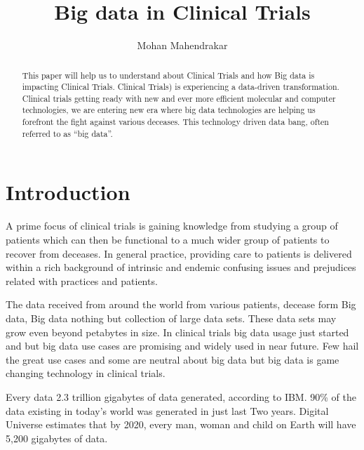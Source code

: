 \documentclass[sigconf]{acmart}
\begin{document}
\title{Big data in Clinical Trials}
\author{Mohan Mahendrakar}

\renewcommand{\shortauthors}{B. Trovato et al.}


\begin{abstract}
This paper will help us to understand about Clinical Trials and how Big
data is impacting Clinical Trials. Clinical Trials) is experiencing a
data-driven transformation. Clinical trials getting ready with new and 
ever more efficient molecular and computer technologies, we are entering
new era where big data technologies are helping us forefront the fight 
against various deceases. This technology driven data bang, often 
referred to as ``big data''\cite{TR01}.
\end{abstract}


\maketitle

\section{Introduction}
A prime focus of clinical trials is gaining knowledge from studying
a group of patients which can then be functional to a much wider group of
patients to recover from deceases. In general practice, providing care 
to patients is delivered within a rich background of intrinsic and
endemic confusing issues and prejudices related with practices and 
patients\cite{TR02}.

The data received from around the world from various patients, 
decease form Big data, Big data nothing but collection of large 
data sets. These data sets may grow even beyond petabytes in size.  
In clinical trials big data usage just started and but big data use
cases are promising and widely used in near future. Few hail the great
use cases and some are neutral about big data but big data is game 
changing technology in clinical trials\cite{TR05}. 

Every data 2.3 trillion gigabytes of data generated, according to IBM. 
90\% of the data existing in today’s world was generated in just last 
Two years. Digital Universe estimates that by 2020, every man, woman
and child on Earth will have 5,200 gigabytes of data.
\end{document}
